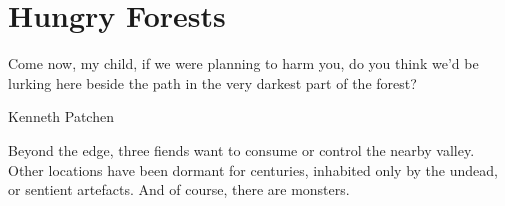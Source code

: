 \chapter{Hungry Forests}
\epigraph{Come now, my child, if we were planning to harm you, do you think we'd be lurking here beside the path in the very darkest part of the forest?}{Kenneth Patchen}

\label{forestChapter}

\noindent
Beyond the \gls{edge}, three \glspl{fiend} want to consume or control the nearby \gls{valley}.
Other locations have been dormant for centuries, inhabited only by the undead, or sentient \glspl{artefact}.
And of course, there are \glspl{monster}.%


